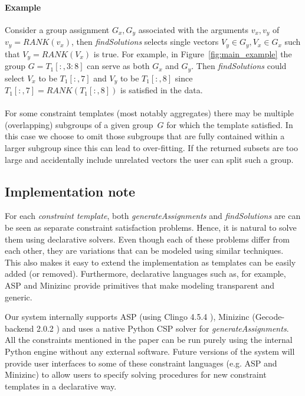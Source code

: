 \documentclass{ecai}
\newcommand{\format}[1]{\textit{#1}\xspace}
\newcommand{\generategroups}{\format{generateAssignments}}
\newcommand{\findassignment}{\format{findSolutions}}
\newcommand{\template}{\format{constraint template}}
\newcommand{\range}[3]{\ensuremath{#1[#2,#3]}}
\newcommand{\rangeto}[2]{#1{:}#2}
\newcommand{\rangeall}{:}
\newcommand{\eccalc}[2]{\ensuremath{#1 = #2}}
\newcommand{\ecrank}[2]{\eccalc{#1}{\mathit{RANK}(#2)}}
\begin{document}
\paragraph{Example}
Consider a group assignment $G_x, G_y$ associated with the arguments $v_x,v_y$ of \ecrank{v_y}{v_x}, then \findassignment selects single vectors $V_y \in G_y, V_x \in G_x$ such that \ecrank{V_y}{V_x} is true.
For example, in Figure~\ref{fig:main_example} the group $G = \range{T_1}{\rangeall}{\rangeto{3}{8}}$ can serve as both $G_x$ and $G_y$.
Then \findassignment could select $V_x$ to be $\range{T_1}{\rangeall}{7}$ and $V_y$ to be $\range{T_1}{\rangeall}{8}$ since \ecrank{\range{T_1}{\rangeall}{7}}{\range{T_1}{\rangeall}{8}} is satisfied in the data.
\\\\
For some constraint templates (most notably aggregates) there may be multiple (overlapping) subgroups of a given group~$G$ for which the template satisfied.
In this case we choose to omit those subgroups that are fully contained within a larger subgroup since this can lead to over-fitting.
If the returned subsets are too large and accidentally include unrelated vectors the user can split such a group.

\subsection{Implementation note}
For each \template, both \generategroups and \findassignment are can be seen as separate constraint satisfaction problems.
Hence, it is natural to solve them using declarative solvers.
Even though each of these problems differ from each other, they are variations that can be modeled using similar techniques.
This also makes it easy to extend the implementation as templates can be easily added (or removed).
Furthermore, declarative languages such as, for example, ASP \cite{whaisasp} and Minizinc \cite{minizinc} provide primitives that make modeling transparent and generic.

Our system internally supports ASP (using Clingo 4.5.4 \cite{clingo}), Minizinc (Gecode-backend 2.0.2 \cite{minizinc}) and uses a native Python CSP solver \cite{python_constraint} for \generategroups.
All the constraints mentioned in the paper can be run purely using the internal Python engine without any external software.
Future versions of the system will provide user interfaces to some of these constraint languages (e.g. ASP and Minizinc) to allow users to specify solving procedures for new constraint templates in a declarative way.
\end{document}
